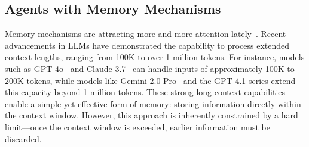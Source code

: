 \subsection{Agents with Memory Mechanisms}
\label{sub:agents_with_memory_mechanisms}
Memory mechanisms are attracting more and more attention lately~\citep{lscs}.
Recent advancements in LLMs have demonstrated the capability to process extended context lengths, ranging from 100K to over 1 million tokens. For instance, models such as GPT-4o~\citep{openai2025gpt4o} and Claude 3.7~\citep{anthropic2025claude37} can handle inputs of approximately 100K to 200K tokens, while models like Gemini 2.0 Pro~\citep{deepmind2025gemini} and the GPT-4.1 series extend this capacity beyond 1 million tokens. These strong long-context capabilities enable a simple yet effective form of memory: storing information directly within the context window. However, this approach is inherently constrained by a hard limit—once the context window is exceeded, earlier information must be discarded.

